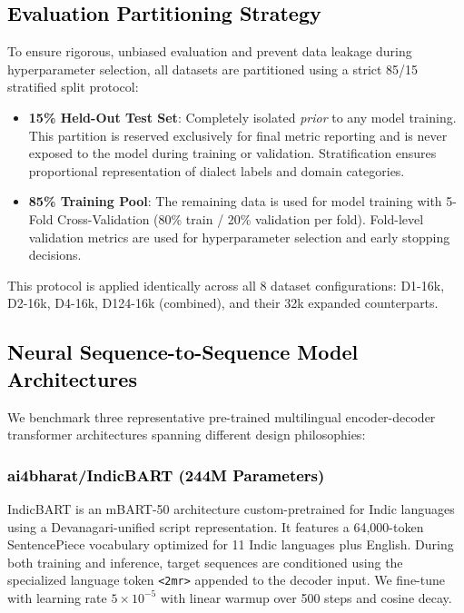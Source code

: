 \subsection{\textcolor{black}{Evaluation Partitioning Strategy}}

To ensure rigorous, unbiased evaluation and prevent data leakage during hyperparameter selection, all datasets are partitioned using a strict 85/15 stratified split protocol:

\begin{itemize}
    \item \textbf{15\% Held-Out Test Set}: Completely isolated \textit{prior} to any model training. This partition is reserved exclusively for final metric reporting and is never exposed to the model during training or validation. Stratification ensures proportional representation of dialect labels and domain categories.
    \item \textbf{85\% Training Pool}: The remaining data is used for model training with 5-Fold Cross-Validation (80\% train / 20\% validation per fold). Fold-level validation metrics are used for hyperparameter selection and early stopping decisions.
\end{itemize}

This protocol is applied identically across all 8 dataset configurations: D1-16k, D2-16k, D4-16k, D124-16k (combined), and their 32k expanded counterparts.

\subsection{\textcolor{black}{Neural Sequence-to-Sequence Model Architectures}}

We benchmark three representative pre-trained multilingual encoder-decoder transformer architectures spanning different design philosophies:

\subsubsection{\textcolor{black}{ai4bharat/IndicBART (244M Parameters)}}

IndicBART \cite{dabre2022indicbart} is an mBART-50 architecture \cite{lewis2020bart} custom-pretrained for Indic languages using a Devanagari-unified script representation. It features a 64,000-token SentencePiece vocabulary optimized for 11 Indic languages plus English. During both training and inference, target sequences are conditioned using the specialized language token \texttt{<2mr>} appended to the decoder input. We fine-tune with learning rate $5 \times 10^{-5}$ with linear warmup over 500 steps and cosine decay.

